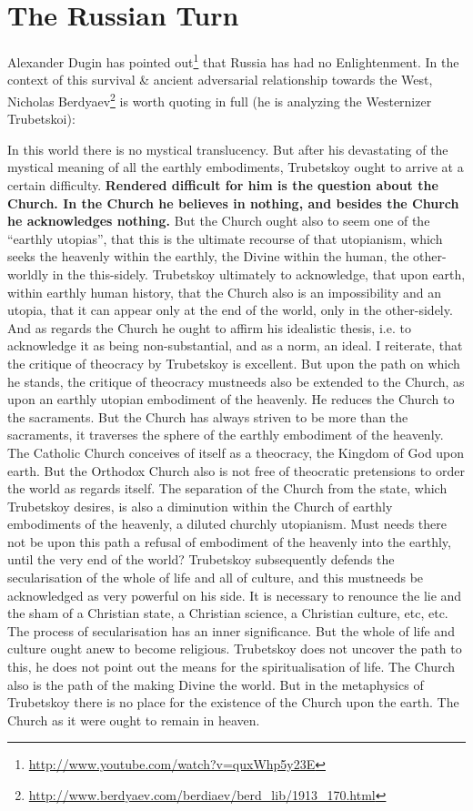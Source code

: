 \section{The Russian Turn}

Alexander Dugin has pointed out\footnote{\url{http://www.youtube.com/watch?v=quxWhp5y23E}} that Russia has had no Enlightenment. In the context of this survival \& ancient adversarial relationship towards the West, Nicholas Berdyaev\footnote{\url{http://www.berdyaev.com/berdiaev/berd\_lib/1913\_170.html}} is worth quoting in full (he is analyzing the Westernizer Trubetskoi):

\begin{quotationx}
In this world there is no mystical translucency. But after his devastating of the mystical meaning of all the earthly embodiments, Trubetskoy ought to arrive at a certain difficulty. \textbf{Rendered difficult for him is the question about the Church. In the Church he believes in nothing, and besides the Church he acknowledges nothing.} But the Church ought also to seem one of the ``earthly utopias'', that this is the ultimate recourse of that utopianism, which seeks the heavenly within the earthly, the Divine within the human, the other-worldly in the this-sidely. Trubetskoy ultimately to acknowledge, that upon earth, within earthly human history, that the Church also is an impossibility and an utopia, that it can appear only at the end of the world, only in the other-sidely. And as regards the Church he ought to affirm his idealistic thesis, i.e. to acknowledge it as being non-substantial, and as a norm, an ideal. I reiterate, that the critique of theocracy by Trubetskoy is excellent. But upon the path on which he stands, the critique of theocracy mustneeds also be extended to the Church, as upon an earthly utopian embodiment of the heavenly. He reduces the Church to the sacraments. But the Church has always striven to be more than the sacraments, it traverses the sphere of the earthly embodiment of the heavenly. The Catholic Church conceives of itself as a theocracy, the Kingdom of God upon earth. But the Orthodox Church also is not free of theocratic pretensions to order the world as regards itself. The separation of the Church from the state, which Trubetskoy desires, is also a diminution within the Church of earthly embodiments of the heavenly, a diluted churchly utopianism. Must needs there not be upon this path a refusal of embodiment of the heavenly into the earthly, until the very end of the world? Trubetskoy subsequently defends the secularisation of the whole of life and all of culture, and this mustneeds be acknowledged as very powerful on his side. It is necessary to renounce the lie and the sham of a Christian state, a Christian science, a Christian culture, etc, etc. The process of secularisation has an inner significance. But the whole of life and culture ought anew to become religious. Trubetskoy does not uncover the path to this, he does not point out the means for the spiritualisation of life. The Church also is the path of the making Divine the world. But in the metaphysics of Trubetskoy there is no place for the existence of the Church upon the earth. The Church as it were ought to remain in heaven.


\end{quotationx}
